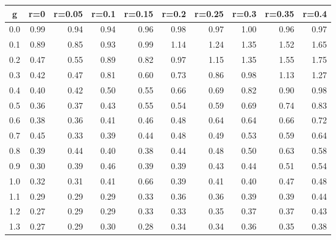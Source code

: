 %
\begin{table}[!tbp]
 \begin{center}
 \begin{tabular}{rrrrrrrrrr}\hline\hline
\multicolumn{1}{c}{g}&\multicolumn{1}{c}{r=0}&\multicolumn{1}{c}{r=0.05}&\multicolumn{1}{c}{r=0.1}&\multicolumn{1}{c}{r=0.15}&\multicolumn{1}{c}{r=0.2}&\multicolumn{1}{c}{r=0.25}&\multicolumn{1}{c}{r=0.3}&\multicolumn{1}{c}{r=0.35}&\multicolumn{1}{c}{r=0.4}\tabularnewline
\hline
0.0&0.99&0.94&0.94&0.96&0.98&0.97&1.00&0.96&0.97\tabularnewline
0.1&0.89&0.85&0.93&0.99&1.14&1.24&1.35&1.52&1.65\tabularnewline
0.2&0.47&0.55&0.89&0.82&0.97&1.15&1.35&1.55&1.75\tabularnewline
0.3&0.42&0.47&0.81&0.60&0.73&0.86&0.98&1.13&1.27\tabularnewline
0.4&0.40&0.42&0.50&0.55&0.66&0.69&0.82&0.90&0.98\tabularnewline
0.5&0.36&0.37&0.43&0.55&0.54&0.59&0.69&0.74&0.83\tabularnewline
0.6&0.38&0.36&0.41&0.46&0.48&0.64&0.64&0.66&0.72\tabularnewline
0.7&0.45&0.33&0.39&0.44&0.48&0.49&0.53&0.59&0.64\tabularnewline
0.8&0.39&0.44&0.40&0.38&0.44&0.48&0.50&0.63&0.58\tabularnewline
0.9&0.30&0.39&0.46&0.39&0.39&0.43&0.44&0.51&0.54\tabularnewline
1.0&0.32&0.31&0.41&0.66&0.39&0.41&0.40&0.47&0.48\tabularnewline
1.1&0.29&0.29&0.29&0.33&0.36&0.36&0.39&0.39&0.44\tabularnewline
1.2&0.27&0.29&0.29&0.33&0.33&0.35&0.37&0.37&0.43\tabularnewline
1.3&0.27&0.29&0.30&0.28&0.34&0.34&0.36&0.35&0.38\tabularnewline
\hline
\end{tabular}

\end{center}

\end{table}

